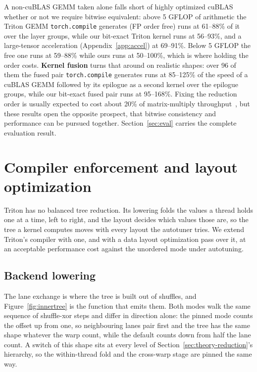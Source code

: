 \documentclass[sigplan,nonacm]{acmart}
\newcommand{\tcompile}{\texttt{torch.\allowbreak compile}}
\begin{document}
A non-cuBLAS GEMM taken alone falls short of highly optimized cuBLAS whether or not 
we require bitwise equivalent:
above 5 GFLOP of arithmetic
the Triton GEMM \tcompile{} generates 
(FP order free) runs at 61--88\% of it over the layer groups, 
while our bit-exact Triton kernel runs at 56--93\%, 
and a large-tensor acceleration (Appendix~\ref{app:accel}) at 69--91\%.
Below 5 GFLOP the free one runs at 59--88\% while ours runs at 50--100\%,
which is where holding the order costs.
\textbf{Kernel fusion} turns that around on realistic shapes: 
over 96 of them the fused pair \tcompile{} generates
runs at 85--125\% of the speed of a cuBLAS GEMM followed by its epilogue as a
second kernel over the epilogue groups, while our bit-exact fused pair runs at
95--168\%. 
Fixing the reduction order is usually expected to cost about 20\% of
matrix-multiply throughput~\cite{he2025defeating}, but these results open the
opposite prospect, that bitwise consistency and performance can be pursued
together.
Section~\ref{sec:eval} carries the complete evaluation result.



\section{Compiler enforcement and layout optimization}
\label{sec:enforcement}

Triton has no balanced tree reduction. Its lowering folds the values a thread
holds one at a time, left to right, and the layout decides which values those
are, so the tree a kernel computes moves with every layout the autotuner tries.
We extend Triton's compiler with one, and with a data layout optimization pass over it,
at an acceptable performance cost against the unordered mode under autotuning.

\subsection{Backend lowering}
\label{sec:enforcement-lowering}

The lane exchange is where the tree is built out of shuffles, and
Figure~\ref{fig:innertree} is the function that emits them. Both modes walk the
same sequence of shuffle-xor steps and differ in direction alone: the pinned
mode counts the offset up from one, so neighbouring lanes pair first and the
tree has the same shape whatever the warp count, while the default counts down
from half the lane count. A switch of this shape sits at every level of
Section~\ref{sec:theory-reduction}'s hierarchy, so the within-thread fold and
the cross-warp stage are pinned the same way.
\end{document}
